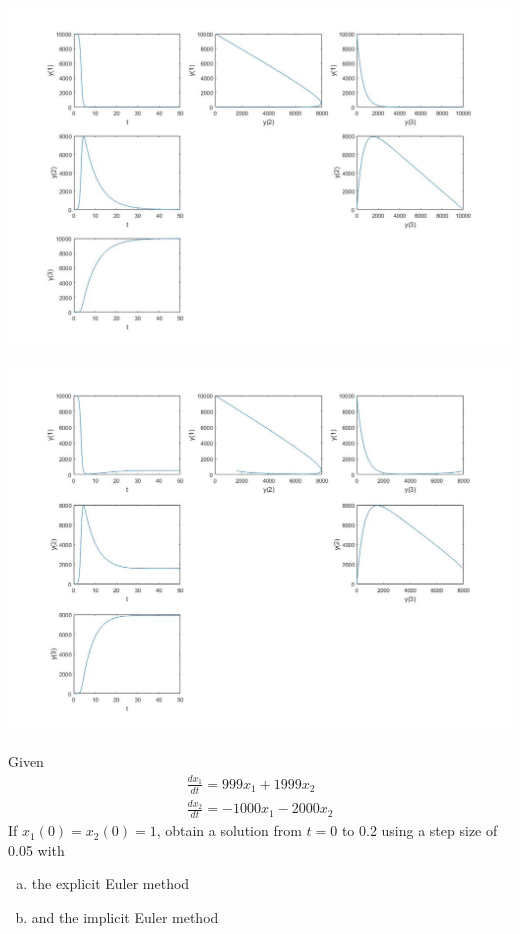 \documentclass{article}
\begin{document}
\includegraphics[width=\linewidth]{HW11-epidemic.jpg}

\includegraphics[width=\linewidth]{HW11-epidemic2.jpg}

\setcounter{problem}{6}
\begin{problem}
Given
\begin{align*}
\frac{dx_{1}}{dt} = 999x_{1} + 1999x_{2}\\
\frac{dx_{2}}{dt} = -1000x_{1} -2000x_{2}
\end{align*}
If $x_{1}(0)=x_{2}(0)=1$, obtain a solution from $t=0$ to 0.2 using a step size of 0.05 with
\begin{enumerate}[(a)]
\item the explicit Euler method
\item and the implicit Euler method
\end{enumerate}
\end{problem}
\end{document}
